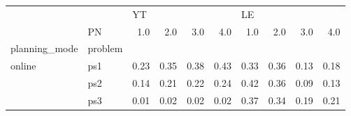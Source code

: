 \begin{tabular}{llrrrrrrrr}
\toprule
       & {} & \multicolumn{4}{l}{YT} & \multicolumn{4}{l}{LE} \\
       & PN &  1.0 &  2.0 &  3.0 &  4.0 &  1.0 &  2.0 &  3.0 &  4.0 \\
planning\_mode & problem &      &      &      &      &      &      &      &      \\
\midrule
online & ps1 & 0.23 & 0.35 & 0.38 & 0.43 & 0.33 & 0.36 & 0.13 & 0.18 \\
       & ps2 & 0.14 & 0.21 & 0.22 & 0.24 & 0.42 & 0.36 & 0.09 & 0.13 \\
       & ps3 & 0.01 & 0.02 & 0.02 & 0.02 & 0.37 & 0.34 & 0.19 & 0.21 \\
\bottomrule
\end{tabular}
